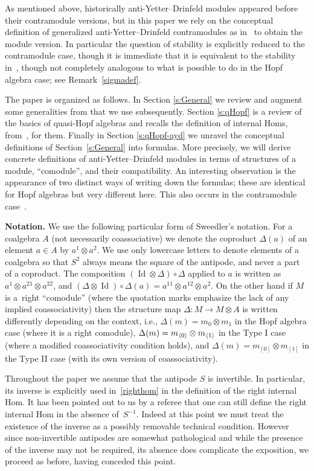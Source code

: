 \documentclass[10pt,a4paper]{amsart}
\newcommand{\ns}[1]{~\hspace{-3pt}_{\left<#1\right>}}
\def\ot{\otimes}
\numberwithin{equation}{section}
\begin{document}
As mentioned above, historically anti-Yetter--Drinfeld modules appeared before their contramodule versions, but in this paper we rely on the conceptual definition of generalized anti-Yetter--Drinfeld contramodules as in~\cite{sk} to obtain the module version. In particular the question of stability is explicitly reduced to the contramodule case, though it is immediate that it is equivalent to the stability in~\cite{hks}, though not completely analogous to what is possible to do in the Hopf algebra case; see Remark~\ref{sigmadef}.

The paper is organized as follows. In Section \ref{s:General} we review and augment some generalities from \cite{sk} that we use subsequently. Section \ref{s:qHopf} is a review of the basics of quasi-Hopf algebras and recalls the definition of internal Homs, from~\cite{sk}, for them. Finally in Section \ref{s:qHopf-ayd} we unravel the conceptual definitions of Section~\ref{s:General} into formulas. More precisely, we will derive concrete definitions of anti-Yetter--Drinfeld modules in terms of structures of a module, ``comodule'', and their compatibility. An interesting observation is the appearance of two distinct ways of writing down the formulas; these are identical for Hopf algebras but very different here. This also occurs in the contramodule case~\cite{sk}.

\textbf{Notation.} We use the following particular form of Sweedler's notation. For a coalgebra $A$ (not necessarily coassociative) we denote the coproduct $\Delta(a)$ of an element $a\in A$ by $a^1\ot a^2$. We use only lowercase letters to denote elements of a coalgebra so that $S^2$ always means the square of the antipode, and never a part of a coproduct. The composition $(\operatorname{Id}\ot\Delta)\circ\Delta$ applied to $a$ is written as $a^1\ot a^{21}\ot a^{22}$, and $(\Delta\ot \operatorname{Id})\circ\Delta(a)=a^{11}\ot a^{12}\ot a^2$. On the other hand if $M$ is a~right ``comodule'' (where the quotation marks emphasize the lack of any implied coassociativity) then the structure map $\Delta\colon M\to M\ot A$ is written differently depending on the context, i.e., $\Delta(m)=m_{0}\ot m_{1}$ in the Hopf algebra case (where it is a right comodule), $\Delta(m)=m\ns{0}\ot m\ns{1}$ in the Type I case (where a modified coassociativity condition holds), and $\Delta(m)=m_{[0]} \otimes m_{[1]}$ in the Type II case (with its own version of coassociativity).

\begin{Remark}Throughout the paper we assume that the antipode $S$ is invertible. In particular, its inverse is explicitly used in~\eqref{righthom} in the definition of the right internal Hom. It has been pointed out to us by a referee that one can still define the right internal Hom in the absence of~$S^{-1}$. Indeed at this point we must treat the existence of the inverse as a possibly removable technical condition. However since non-invertible antipodes are somewhat pathological and while the presence of the inverse may not be required, its absence does complicate the exposition, we proceed as before, having conceded this point.
 \end{Remark}
\end{document}
